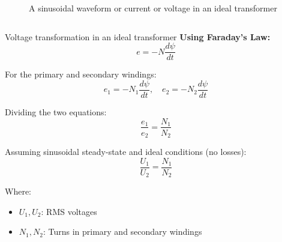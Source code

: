 \begin{frame}
\begin{columns}
\begin{column}{0.4\textwidth}
\begin{figure}
				\caption{A sinusoidal waveform or current or voltage in an ideal transformer}
			\end{figure}
	\end{column}
    \end{columns}  
\end{frame}


\begin{frame}{Voltage transformation in an ideal transformer}
	\textbf{Using Faraday's Law:}
	\begin{equation}
	e = -N \frac{d\psi}{dt}
	\end{equation}
	
	For the primary and secondary windings:
	\begin{equation}
	e_1 = -N_1 \frac{d\psi}{dt}, \quad e_2 = -N_2 \frac{d\psi}{dt}
	\end{equation}
	
	Dividing the two equations:
	\begin{equation}
	\frac{e_1}{e_2} = \frac{N_1}{N_2}
	\end{equation}
	
	Assuming sinusoidal steady-state and ideal conditions (no losses):
	\begin{equation}
	\frac{U_1}{U_2} = \frac{N_1}{N_2}
	\end{equation}
	
	Where:
	\begin{itemize}
		\item \( U_1, U_2 \): RMS voltages
		\item \( N_1, N_2 \): Turns in primary and secondary windings
	\end{itemize}
\end{frame}



